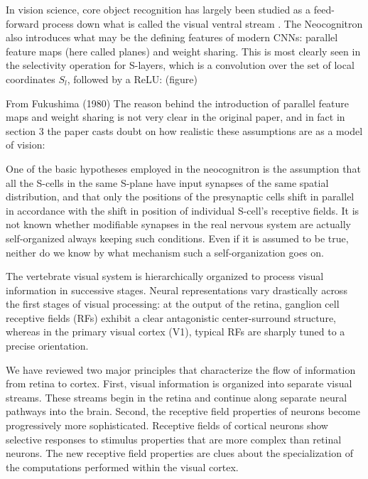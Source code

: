 In vision science, core object recognition has largely been studied as a feed-forward process down what is called the visual ventral stream \parencite{dicarlo_how_2012}.
The Neocognitron also introduces what may be the defining features of modern CNNs: parallel feature maps (here called planes) and weight sharing. This is most clearly seen in the selectivity operation for S-layers, which is a convolution over the set of local coordinates $S_l$, followed by a ReLU:
(figure)

From Fukushima (1980)
The reason behind the introduction of parallel feature maps and weight sharing is not very clear in the original paper, and in fact in section 3 the paper casts doubt on how realistic these assumptions are as a model of vision:

One of the basic hypotheses employed in the neocognitron is the assumption that all the S-cells in the same S-plane have input synapses of the same spatial distribution, and that only the positions of the presynaptic cells shift in parallel in accordance with the shift in position of individual S-cell’s receptive fields. It is not known whether modifiable synapses in the real nervous system are actually self-organized always keeping such conditions. Even if it is assumed to be true, neither do we know by what mechanism such a self-organization goes on.

The vertebrate visual system is hierarchically organized to process visual information in successive stages. Neural representations vary drastically across the first stages of visual processing: at the output of the retina, ganglion cell receptive fields (RFs) exhibit a clear antagonistic center-surround structure, whereas in the primary visual cortex (V1), typical RFs are sharply tuned to a precise orientation.

We have reviewed two major principles that characterize the flow of information from retina to cortex. First, visual information is organized into separate visual streams. These streams begin in the retina and continue along separate neural pathways into the brain. Second, the receptive field properties of neurons become progressively more sophisticated. Receptive fields of cortical neurons show selective responses to stimulus properties that are more complex than retinal neurons. The new receptive field properties are clues about the specialization of the computations performed within the visual cortex.

